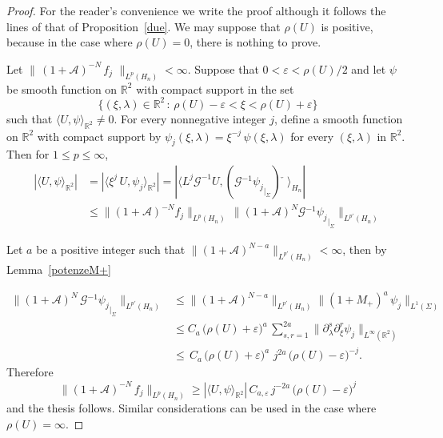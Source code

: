 \documentclass[12pt,a4paper]{amsart}
\theoremstyle{plain}
\theoremstyle{definition}
\numberwithin{equation}{section}
\begin{document}
 \begin{proof} For the 
 reader's convenience we write the proof although it  
  follows the lines of that of Proposition~\ref{due}.
We may suppose that  ${\rho}(U)$ is positive, because
in the case where ${\rho}(U)=0$, there is nothing to prove.
 
   Let  $\|\,(1+{\mathcal A})^{-N}\, f_j\,\,\|_{L^p({{H_{n}}})}<\infty$.
 Suppose that $0<{\varepsilon} < {\rho}(U)/2$ and let  $\psi$ be smooth function on ${\mathbb R}^2$
  with compact support in the set 
$$
\{(\xi,{\lambda})\in {\mathbb R}^2\, :\, {\rho}(U)-{\varepsilon}<\xi< {\rho}(U)+{\varepsilon} \}
$$
 such that
${\langle {U},{\psi} \rangle_{{\mathbb R}^2}}\neq 0$. 
For every nonnegative integer $j$, 
define a smooth function on ${\mathbb R}^2$
  with compact support by 
  $\psi_j(\xi,{\lambda})=\xi^{-j}\, \psi(\xi,{\lambda})$ for every $(\xi,{\lambda})$ in ${\mathbb R}^2$.
  Then for $1\leq p\leq \infty$,
  \begin{align*}
|{\langle {U},{\psi} \rangle_{{\mathbb R}^2}}|
&=
|{\langle {\xi^j\,U},{ \psi_j} \rangle_{{\mathbb R}^2}}|
=
|{\langle { {L^j {\mathcal G}^{-1}U}},{({\mathcal G}{^{-1}} {\psi_j}_{|_\Sigma})\check{\phantom a}} \rangle_{{H_{n}}}}|
\\
&\leq \|(1+{\mathcal A})^{-N}f_j\|_{L^p({{H_{n}}})}\, \|(1+{\mathcal A})^{N}{\mathcal G}{^{-1}} {\psi_j}_{|_\Sigma}
\|_{L^{p'}({{H_{n}}})}
\end{align*}

Let $a$ be a positive integer such that 
$\|(1+{\mathcal A})^{N-a} 
\|_{L^{p'}({{H_{n}}})}<\infty$, then by Lemma~\ref{potenzeM+}

  \begin{align*}
  \|(1+{\mathcal A})^{N}\,{\mathcal G}{^{-1}} {\psi_j}_{|_\Sigma}
\|_{L^{p'}({{H_{n}}})}
 & \leq
\|(1+{\mathcal A})^{N-a} 
\|_{L^{p'}({{H_{n}}})} 
\| (1+M_+ )^a\,  {\psi_j} 
\|_{L^1({\Sigma})}
\\ 
& \leq C_a
\,\big({\rho}(U)+{\varepsilon}\big)^{a}\, 
\sum_{s,r=1}^{2a}\|\partial_{\lambda}^s\partial_\xi^r \psi_j \|_{L^\infty({\mathbb R}^2)} 
\\ & \leq 
\,C_a
\,\big({\rho}(U)+{\varepsilon}\big)^{a}\, \, j^{2a}\,\big({\rho}(U)-{\varepsilon}\big)^{-j}.
\end{align*}
  Therefore
  $$
  \|(1+{\mathcal A})^{-N}\,f_j\|_{L^p({{H_{n}}})}
\geq 
 {|{\langle {U},{\psi} \rangle_{{\mathbb R}^2}}|}  \, C_{a,{\varepsilon}}\,j^{-2a}\,\big({\rho}(U)-{\varepsilon}\big)^{j}
   $$
   and the thesis follows.
  Similar considerations can be used in the case where $\rho(U)=\infty$. 
 \end{proof}
 
\end{document}
